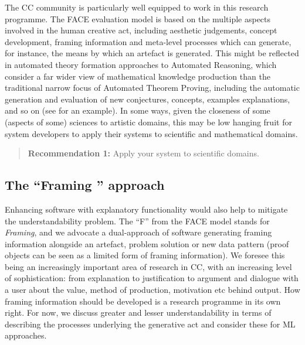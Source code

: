 \documentclass[letterpaper]{article}
\begin{document}
The CC community is particularly well equipped to work in this
research programme. The FACE evaluation model \cite{colton11} is
based on the multiple aspects involved in the human creative act,
including aesthetic judgements, concept development, framing
information and meta-level processes which can generate, for instance,
the means by which an artefact is generated. This might be reflected
in automated theory formation approaches to Automated Reasoning, which
consider a far wider view of mathematical knowledge production than
the traditional narrow focus of Automated Theorem Proving, including
the automatic generation and evaluation of new conjectures, concepts,
examples explanations, and so on (see \cite{atf-the-next-generation}
for an example). In some ways, given the closeness of some (aspects of
some) sciences to artistic domains, this may be low hanging fruit for
system developers to apply their systems to scientific and
mathematical domains.


\begin{quote}
    {\bf Recommendation 1:} Apply your system to scientific domains.

\end{quote}

\subsection{The ``Framing '' approach}
Enhancing software with explanatory functionality would also help to
mitigate the understandability problem. The ``F'' from the FACE model
stands for {\em Framing}, and we advocate a dual-approach of software
generating framing information alongside an artefact, problem solution
or new data pattern (proof objects can be seen as a limited form of framing
information). We foresee this being an increasingly important area of
research in CC, with an increasing level of sophistication:
from explanation to justification to argument and dialogue with a user
about the value, method of production, motivation etc behind
output. How framing information should be developed is a research programme in
its own right. For now, we discuss greater and lesser understandability in
terms of describing the processes underlying the generative act and consider
these for ML approaches.
\end{document}
